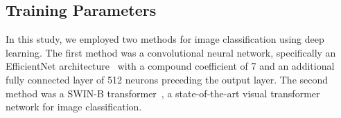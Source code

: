 \begin{table}[h]
	\centering
	\caption{Number of images per diagnosis in each dataset.}
	\label{tab:generalisation_datasets}
\end{table}

\subsection{Training Parameters}
\label{subsec:generalisation_training}
In this study, we employed two methods for image classification using deep learning. The first method was a convolutional neural network, specifically an EfficientNet architecture~\citep{tan2019efficient} with a compound coefficient of 7 and an additional fully connected layer of 512 neurons preceding the output layer. The second method was a SWIN-B transformer~\citep{liu2021swin}, a state-of-the-art visual transformer network for image classification.

